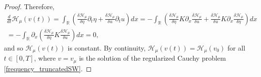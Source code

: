 \documentclass[reqno,12pt,a4paper]{article}
\theoremstyle{plain}
\newcommand{\R}{\mathbb{R}}
\begin{document}
\begin{proof}
%
Therefore,
\begin{multline*}
    \frac d{dt}
	\mathcal H_{\mu}(v(t))
    =
	\int_\R
	\left(
        \frac{\delta \mathcal H_{\mu}}{\delta \eta}
        \partial_t \eta
		+
        \frac{\delta \mathcal H_{\mu}}{\delta u}
        \partial_t u
	\right)
	dx
    =
    -
	\int_\R
	\left(
        \frac{\delta \mathcal H_{\mu}}{\delta \eta}
        K \partial_x
        \frac{\delta \mathcal H_{\mu}}{\delta u}
		+
        \frac{\delta \mathcal H_{\mu}}{\delta u}
        K \partial_x
        \frac{\delta \mathcal H_{\mu}}{\delta \eta}
	\right)
	dx
    \\
    =
    -
	\int_\R
    \partial_x
	\left(
        \frac{\delta \mathcal H_{\mu}}{\delta \eta}
        K
        \frac{\delta \mathcal H_{\mu}}{\delta u}
	\right)
	dx
    =
    0
    ,
\end{multline*}
%
and so $\mathcal H_{\mu}(v(t))$ is constant.
By continuity,
\(
    \mathcal H_{\mu}(v(t)) = \mathcal H_{\mu}(v_0)
\)
for all $t \in [0, T]$,
where
$v = v_{\mu}$ is the solution of the regularized Cauchy problem \eqref{frequency_truncatedSW}.



\end{proof}
\end{document}

